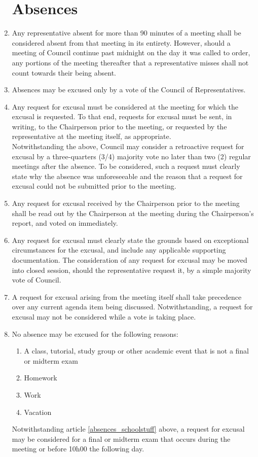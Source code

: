 \documentclass[oneside]{book}
\begin{document}
\begin{enumerate}
\chapter{\label{Absences}Absences}
\item Any representative absent for more than 90 minutes of a meeting shall be considered absent from that meeting 
in its entirety. However, should a meeting of Council continue past midnight on the day it was called to order, 
any portions of the meeting thereafter that a representative misses shall not count towards their being absent.
\item Absences may be excused only by a vote of the Council of Representatives.
\item  Any request for excusal must be considered at the meeting for which the excusal is requested. 
To that end, requests for excusal must be sent, in writing, to the Chairperson prior to the meeting, 
or requested by the representative at the meeting itself, as appropriate.
\\Notwithstanding the above, Council may consider a retroactive request for excusal by a
three-quarters (3/4) majority vote no later than two (2) regular meetings after
the absence. To be considered, such a request must clearly state why the absence was unforeseeable and the 
reason that a request for excusal could not be submitted prior to the meeting. 
\item Any request for excusal received by the Chairperson prior to the meeting shall be read out 
by the Chairperson at the meeting during the Chairperson's report, and voted on immediately. 
\item Any request for excusal must clearly state the grounds based on exceptional circumstances for the excusal, 
and include any applicable supporting documentation. The consideration of any request for excusal may be moved 
into closed session, should the representative request it, by a simple majority vote of Council.
\item A request for excusal arising from the meeting itself shall take precedence over any current agenda 
item being discussed. Notwithstanding, a request for excusal may not be considered while a vote is taking place. 
\item No absence may be excused for the following reasons:
\begin{enumerate}
\item\label{absences_schoolstuff} A class, tutorial, study group or other academic event that is not a final or midterm exam
\item Homework 
\item Work 
\item Vacation 
\end{enumerate}
Notwithstanding article \ref{absences_schoolstuff} above, a request for excusal may be considered
for a final or midterm exam that occurs during the meeting or before 10h00 the following day.


\end{enumerate}
\end{document}
